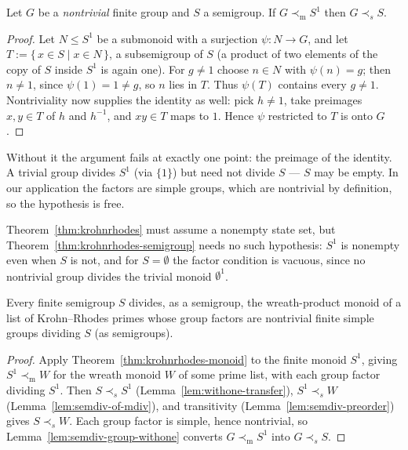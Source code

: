 \begin{lemma}\label{lem:semdiv-group-withone}
  \leanok
  Let $G$ be a \emph{nontrivial} finite group and $S$ a semigroup. If
  $G \prec_{\mathrm m} S^1$ then $G \prec_s S$.
\end{lemma}
\begin{proof}
  \leanok
  Let $N \le S^1$ be a submonoid with a surjection $\psi : N \to G$,
  and let $T := \{\, x \in S \mid x \in N \,\}$, a subsemigroup of $S$
  (a product of two elements of the copy of $S$ inside $S^1$ is again
  one).
  For $g \neq 1$ choose $n \in N$ with $\psi(n) = g$; then $n \neq 1$,
  since $\psi(1) = 1 \neq g$, so $n$ lies in $T$. Thus $\psi(T)$
  contains every $g \neq 1$. Nontriviality now supplies the identity
  as well: pick $h \neq 1$, take preimages $x, y \in T$ of $h$ and
  $h^{-1}$, and $xy \in T$ maps to $1$. Hence $\psi$ restricted to $T$
  is onto $G$.
\end{proof}

\begin{remark}\label{rem:semdiv-nontrivial}
  Without it the argument fails at exactly one point: the preimage of
  the identity. A trivial group divides $S^1$ (via $\{1\}$) but need
  not divide $S$ --- $S$ may be empty. In our application the factors
  are simple groups, which are nontrivial by definition, so the
  hypothesis is free.
\end{remark}

\begin{remark}\label{rem:semigroup-empty}
  Theorem~\ref{thm:krohnrhodes} must assume a nonempty state set, but
  Theorem~\ref{thm:krohnrhodes-semigroup} needs no such hypothesis:
  $S^1$ is nonempty even when $S$ is not, and for $S = \emptyset$ the
  factor condition is vacuous, since no nontrivial group divides the
  trivial monoid $\emptyset^1$.
\end{remark}

\begin{theorem}\label{thm:krohnrhodes-semigroup}
  \leanok
  Every finite semigroup $S$ divides, as a semigroup, the wreath-product
  monoid of a list of Krohn--Rhodes primes whose group factors are
  nontrivial finite simple groups dividing $S$ (as semigroups).
\end{theorem}
\begin{proof}
  \leanok
  Apply Theorem~\ref{thm:krohnrhodes-monoid} to the finite monoid
  $S^1$, giving $S^1 \prec_{\mathrm m} W$ for the wreath monoid $W$ of some
  prime list, with each group factor dividing $S^1$. Then
  $S \prec_s S^1$ (Lemma~\ref{lem:withone-transfer}),
  $S^1 \prec_s W$ (Lemma~\ref{lem:semdiv-of-mdiv}), and transitivity
  (Lemma~\ref{lem:semdiv-preorder}) gives $S \prec_s W$. Each group
  factor is simple, hence nontrivial, so
  Lemma~\ref{lem:semdiv-group-withone} converts $G \prec_{\mathrm m} S^1$ into
  $G \prec_s S$.
\end{proof}

